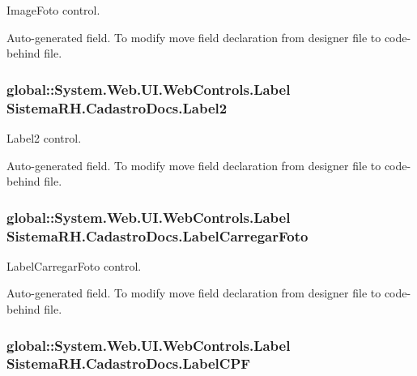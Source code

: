 ImageFoto control. 

Auto-\/generated field. To modify move field declaration from designer file to code-\/behind file. \hypertarget{class_sistema_r_h_1_1_cadastro_docs_a61437f8fee7b34017fcb089f43e0e0aa}{
\subsubsection[{Label2}]{\setlength{\rightskip}{0pt plus 5cm}global::System.Web.UI.WebControls.Label {\bf SistemaRH.CadastroDocs.Label2}}}
\label{class_sistema_r_h_1_1_cadastro_docs_a61437f8fee7b34017fcb089f43e0e0aa}


Label2 control. 

Auto-\/generated field. To modify move field declaration from designer file to code-\/behind file. \hypertarget{class_sistema_r_h_1_1_cadastro_docs_aa06556274477ad182494a5bed500f69f}{
\subsubsection[{LabelCarregarFoto}]{\setlength{\rightskip}{0pt plus 5cm}global::System.Web.UI.WebControls.Label {\bf SistemaRH.CadastroDocs.LabelCarregarFoto}}}
\label{class_sistema_r_h_1_1_cadastro_docs_aa06556274477ad182494a5bed500f69f}


LabelCarregarFoto control. 

Auto-\/generated field. To modify move field declaration from designer file to code-\/behind file. \hypertarget{class_sistema_r_h_1_1_cadastro_docs_a5526d44d5d274f837ab5f0847133844c}{
\subsubsection[{LabelCPF}]{\setlength{\rightskip}{0pt plus 5cm}global::System.Web.UI.WebControls.Label {\bf SistemaRH.CadastroDocs.LabelCPF}}}
\label{class_sistema_r_h_1_1_cadastro_docs_a5526d44d5d274f837ab5f0847133844c}


